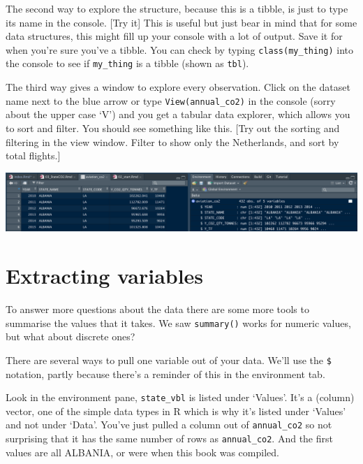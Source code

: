 \documentclass[
]{book}
\newenvironment{Shaded}{\begin{snugshade}}{\end{snugshade}}
\newcommand{\CommentTok}[1]{\textcolor[rgb]{0.56,0.35,0.01}{\textit{#1}}}
\newcommand{\FunctionTok}[1]{\textcolor[rgb]{0.00,0.00,0.00}{#1}}
\newcommand{\NormalTok}[1]{#1}
\newcommand{\OtherTok}[1]{\textcolor[rgb]{0.56,0.35,0.01}{#1}}
\newcommand{\SpecialCharTok}[1]{\textcolor[rgb]{0.00,0.00,0.00}{#1}}
\begin{document}
The second way to explore the structure, because this is a tibble, is just to type its name in the console. {[}Try it{]} This is useful but just bear in mind that for some data structures, this might fill up your console with a lot of output. Save it for when you're sure you've a tibble. You can check by typing \texttt{class(my\_thing)} into the console to see if \texttt{my\_thing} is a tibble (shown as \texttt{tbl}).

The third way gives a window to explore every observation. Click on the dataset name next to the blue arrow or type \texttt{View(annual\_co2)} in the console (sorry about the upper case `V') and you get a tabular data explorer, which allows you to sort and filter. You should see something like this. {[}Try out the sorting and filtering in the view window. Filter to show only the Netherlands, and sort by total flights.{]}

\includegraphics{images/CO2inViewAndEnvironment.png}

\hypertarget{extracting-variables}{%
\section{Extracting variables}\label{extracting-variables}}

To answer more questions about the data there are some more tools to summarise the values that it takes. We saw \texttt{summary()} works for numeric values, but what about discrete ones?

There are several ways to pull one variable out of your data. We'll use the \texttt{\$} notation, partly because there's a reminder of this in the environment tab.

\begin{Shaded}
\end{Shaded}

Look in the environment pane, \texttt{state\_vbl} is listed under `Values'. It's a (column) vector, one of the simple data types in R which is why it's listed under `Values' and not under `Data'. You've just pulled a column out of \texttt{annual\_co2} so not surprising that it has the same number of rows as \texttt{annual\_co2}. And the first values are all ALBANIA, or were when this book was compiled.
\end{document}
